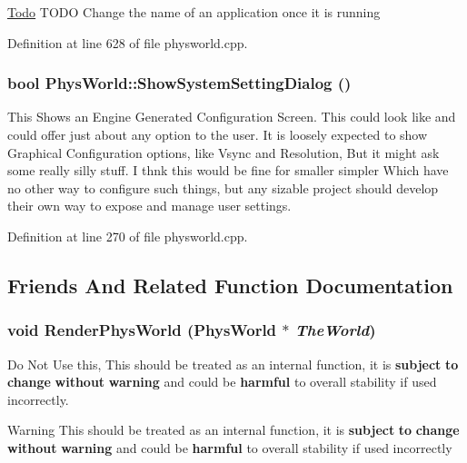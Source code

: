 \begin{Desc}
\item[\hyperlink{todo__todo000011}{Todo}]TODO Change the name of an application once it is running \end{Desc}


Definition at line 628 of file physworld.cpp.\hypertarget{classPhysWorld_a9b83f04907443c6307956a3c4089e3ca}{
\subsubsection[{ShowSystemSettingDialog}]{\setlength{\rightskip}{0pt plus 5cm}bool PhysWorld::ShowSystemSettingDialog ()}}
\label{db/df5/classPhysWorld_a9b83f04907443c6307956a3c4089e3ca}


This Shows an Engine Generated Configuration Screen. This could look like and could offer just about any option to the user. It is loosely expected to show Graphical Configuration options, like Vsync and Resolution, But it might ask some really silly stuff. I thnk this would be fine for smaller simpler Which have no other way to configure such things, but any sizable project should develop their own way to expose and manage user settings. 

Definition at line 270 of file physworld.cpp.

\subsection{Friends And Related Function Documentation}
\hypertarget{classPhysWorld_a54ca2a75bbccb9b2129f434874f1e693}{
\subsubsection[{RenderPhysWorld}]{\setlength{\rightskip}{0pt plus 5cm}void RenderPhysWorld ({\bf PhysWorld} $\ast$ {\em TheWorld})}}
\label{db/df5/classPhysWorld_a54ca2a75bbccb9b2129f434874f1e693}


Do Not Use this, This should be treated as an internal function, it is {\bfseries subject} {\bfseries to} {\bfseries change} {\bfseries without} {\bfseries warning} and could be {\bfseries harmful} to overall stability if used incorrectly. \begin{DoxyWarning}{Warning}
This should be treated as an internal function, it is {\bfseries subject} {\bfseries to} {\bfseries change} {\bfseries without} {\bfseries warning} and could be {\bfseries harmful} to overall stability if used incorrectly 
\end{DoxyWarning}


